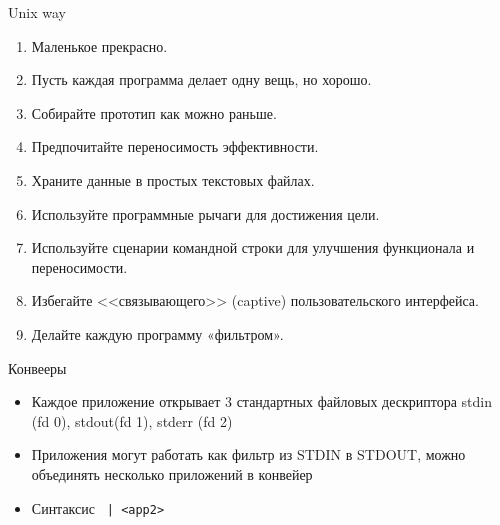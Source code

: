 \documentclass[ignorenonframetext, professionalfonts, hyperref={pdftex, unicode}]{beamer}
\begin{document}
\begin{frame}{Unix way}
  \begin{enumerate}
    \item   Маленькое прекрасно.
    \item   Пусть каждая программа делает одну вещь, но хорошо.
    \item   Собирайте прототип как можно раньше.
    \item   Предпочитайте переносимость эффективности.
    \item   Храните данные в простых текстовых файлах.
    \item   Используйте программные рычаги для достижения цели.
    \item   Используйте сценарии командной строки для улучшения функционала и переносимости.
    \item   Избегайте <<связывающего>> (captive) пользовательского интерфейса.
    \item   Делайте каждую программу «фильтром».
  \end{enumerate}
\end{frame}

\begin{frame}{Конвееры}
  \begin{itemize}
    \item <1-> Каждое приложение открывает 3 стандартных файловых дескриптора stdin (fd 0), stdout(fd 1), stderr (fd 2)
    \item <2-> Приложения могут работать как фильтр из STDIN в STDOUT, можно объединять несколько приложений в конвейер
    \item <2-> Синтаксис {\tt <app1> | <app2>}
  \end{itemize}
\end{frame}
\end{document}
